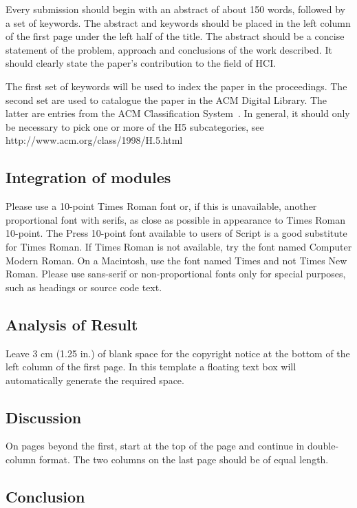 \documentclass{chi2009}
\begin{document}
\begin{Abstract}
Every submission should begin with an abstract of about 150 words,
followed by a set of keywords. The abstract and keywords should be
placed in the left column of the first page under the left half of the
title. The abstract should be a concise statement of the problem,
approach and conclusions of the work described.  It should clearly
state the paper's contribution to the field of HCI.

The first set of keywords will be used to index the paper in the
proceedings. The second set are used to catalogue the paper in the ACM
Digital Library. The latter are entries from the ACM Classification
System~\cite{acm_categories}.  In general, it should only be necessary
to pick one or more of the H5 subcategories, see
http://www.acm.org/class/1998/H.5.html

\subsection{Integration of modules}

Please use a 10-point Times Roman font or, if this is unavailable,
another proportional font with serifs, as close as possible in
appearance to Times Roman 10-point. The Press 10-point font available
to users of Script is a good substitute for Times Roman. If Times
Roman is not available, try the font named Computer Modern Roman. On a
Macintosh, use the font named Times and not Times New Roman. Please
use sans-serif or non-proportional fonts only for special purposes,
such as headings or source code text.

\subsection{Analysis of Result}

Leave 3 cm (1.25 in.) of blank space for the copyright notice at the
bottom of the left column of the first page. In this template a
floating text box will automatically generate the required space.

\subsection{Discussion}

On pages beyond the first, start at the top of the page and continue
in double-column format.  The two columns on the last page should be
of equal length.

\subsection{Conclusion}



\end{Abstract}
\end{document}
